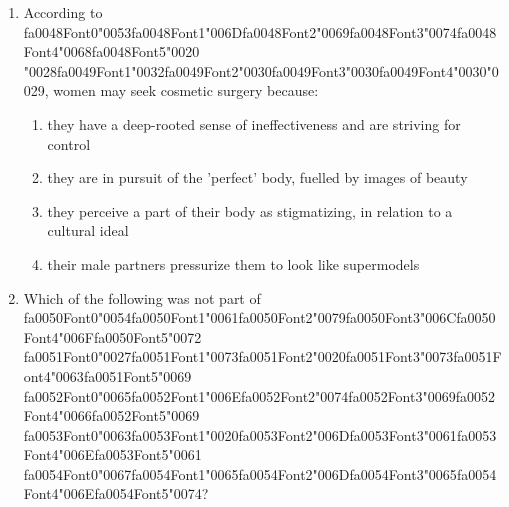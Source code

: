 \documentclass[12pt]{article}
\begin{document}
\begin{enumerate}[label=\arabic*.]
\begin{enumerate}[label=(\alph*)]
    \item the product they were making
    \item the production process
    \item each other and humanity in general
    \item all of the above
\end{enumerate}
\item According to {\csname fa0048Font0\endcsname\char"0053}{\csname fa0048Font1\endcsname\char"006D}{\csname fa0048Font2\endcsname\char"0069}{\csname fa0048Font3\endcsname\char"0074}{\csname fa0048Font4\endcsname\char"0068}{\csname fa0048Font5\endcsname\char"0020} {\char"0028}{\csname fa0049Font1\endcsname\char"0032}{\csname fa0049Font2\endcsname\char"0030}{\csname fa0049Font3\endcsname\char"0030}{\csname fa0049Font4\endcsname\char"0030}{\char"0029}, women may seek cosmetic surgery because:
\begin{enumerate}[label=(\alph*)]
    \item they have a deep-rooted sense of ineffectiveness and are striving for control
    \item they are in pursuit of the 'perfect' body, fuelled by images of beauty
    \item they perceive a part of their body as stigmatizing, in relation to a cultural ideal
    \item their male partners pressurize them to look like supermodels
\end{enumerate}
\item Which of the following was not part of {\csname fa0050Font0\endcsname\char"0054}{\csname fa0050Font1\endcsname\char"0061}{\csname fa0050Font2\endcsname\char"0079}{\csname fa0050Font3\endcsname\char"006C}{\csname fa0050Font4\endcsname\char"006F}{\csname fa0050Font5\endcsname\char"0072} {\csname fa0051Font0\endcsname\char"0027}{\csname fa0051Font1\endcsname\char"0073}{\csname fa0051Font2\endcsname\char"0020}{\csname fa0051Font3\endcsname\char"0073}{\csname fa0051Font4\endcsname\char"0063}{\csname fa0051Font5\endcsname\char"0069} {\csname fa0052Font0\endcsname\char"0065}{\csname fa0052Font1\endcsname\char"006E}{\csname fa0052Font2\endcsname\char"0074}{\csname fa0052Font3\endcsname\char"0069}{\csname fa0052Font4\endcsname\char"0066}{\csname fa0052Font5\endcsname\char"0069} {\csname fa0053Font0\endcsname\char"0063}{\csname fa0053Font1\endcsname\char"0020}{\csname fa0053Font2\endcsname\char"006D}{\csname fa0053Font3\endcsname\char"0061}{\csname fa0053Font4\endcsname\char"006E}{\csname fa0053Font5\endcsname\char"0061} {\csname fa0054Font0\endcsname\char"0067}{\csname fa0054Font1\endcsname\char"0065}{\csname fa0054Font2\endcsname\char"006D}{\csname fa0054Font3\endcsname\char"0065}{\csname fa0054Font4\endcsname\char"006E}{\csname fa0054Font5\endcsname\char"0074}?

\end{enumerate}
\end{document}
